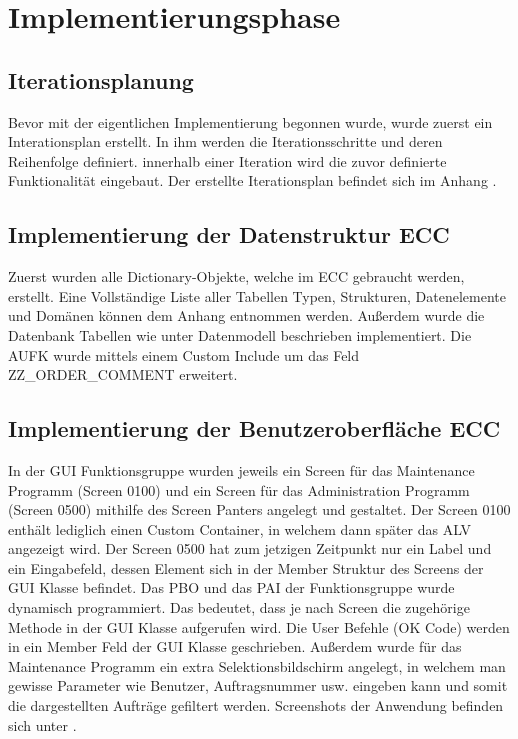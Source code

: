 \section{Implementierungsphase} 
\label{sec:Implementierungsphase}

\subsection{Iterationsplanung}
\label{sec:Iterationsplanung}
Bevor mit der eigentlichen Implementierung begonnen wurde, wurde zuerst ein Interationsplan erstellt. In ihm werden die Iterationsschritte und deren Reihenfolge definiert. innerhalb einer Iteration wird die zuvor definierte Funktionalität eingebaut. Der erstellte Iterationsplan befindet sich im Anhang .

\subsection{Implementierung der Datenstruktur ECC}
\label{sec:Implementierung der Datenstruktur ECC}
Zuerst wurden alle Dictionary-Objekte, welche im \ac{ECC} gebraucht werden, erstellt. Eine Vollständige Liste aller Tabellen Typen, Strukturen, Datenelemente und Domänen können dem Anhang entnommen werden. Außerdem wurde die Datenbank Tabellen wie unter Datenmodell beschrieben implementiert. Die AUFK wurde mittels einem Custom Include um das Feld ZZ\_ORDER\_COMMENT erweitert.

\subsection{Implementierung der Benutzeroberfläche ECC}
\label{sec:Implementierung der Benutzeroberfläche ECC}
In der \ac*{GUI} Funktionsgruppe wurden jeweils ein Screen für das Maintenance Programm (Screen 0100) und ein Screen für das Administration Programm (Screen 0500) mithilfe des Screen Panters angelegt und gestaltet. Der Screen 0100 enthält lediglich einen Custom Container, in welchem dann später das \ac*{ALV} angezeigt wird. Der Screen 0500 hat zum jetzigen Zeitpunkt nur ein Label und ein Eingabefeld, dessen Element sich in der Member Struktur des Screens der GUI Klasse befindet. Das \ac{PBO} und das \ac{PAI} der Funktionsgruppe wurde dynamisch programmiert. Das bedeutet, dass je nach Screen die zugehörige Methode in der \ac*{GUI} Klasse aufgerufen wird. Die User Befehle (OK Code) werden in ein Member Feld der GUI Klasse geschrieben. Außerdem wurde für das Maintenance Programm ein extra Selektionsbildschirm angelegt, in welchem man gewisse Parameter wie Benutzer, Auftragsnummer usw. eingeben kann und somit die dargestellten Aufträge gefiltert werden. Screenshots der Anwendung befinden sich unter .

